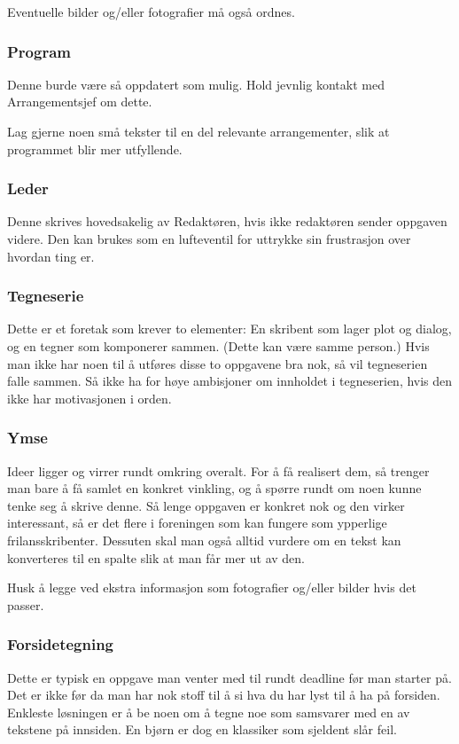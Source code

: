  Eventuelle bilder og/eller fotografier må også ordnes.

\subsubsection{Program}
 Denne burde være så oppdatert som mulig. Hold jevnlig kontakt med
Arrangementsjef om dette.

 Lag gjerne noen små tekster til en del relevante arrangementer, slik
at programmet blir mer utfyllende.

\subsubsection{Leder}
 Denne skrives hovedsakelig av Redaktøren, hvis ikke redaktøren sender
oppgaven videre. Den kan brukes som en lufteventil for uttrykke sin
frustrasjon over hvordan ting er.

\subsubsection{Tegneserie}
 Dette er et foretak som krever to elementer: En skribent som lager
plot og dialog, og en tegner som komponerer sammen. (Dette kan være
samme person.) Hvis man ikke har noen til å utføres disse to oppgavene
bra nok, så vil tegneserien falle sammen. Så ikke ha for høye
ambisjoner om innholdet i tegneserien, hvis den ikke har motivasjonen
i orden.

\subsubsection{Ymse}
 Ideer ligger og virrer rundt omkring overalt. For å få realisert dem,
så trenger man bare å få samlet en konkret vinkling, og å spørre rundt
om noen kunne tenke seg å skrive denne. Så lenge oppgaven er konkret
nok og den virker interessant, så er det flere i foreningen som kan
fungere som ypperlige frilansskribenter. Dessuten skal man også alltid
vurdere om en tekst kan konverteres til en spalte slik at man får mer
ut av den.

 Husk å legge ved ekstra informasjon som fotografier og/eller bilder
hvis det passer.

\subsubsection{Forsidetegning}
 Dette er typisk en oppgave man venter med til rundt deadline før man
starter på. Det er ikke før da man har nok stoff til å si hva du har
lyst til å ha på forsiden. Enkleste løsningen er å be noen om å tegne
noe som samsvarer med en av tekstene på innsiden. En bjørn er dog en
klassiker som sjeldent slår feil.

